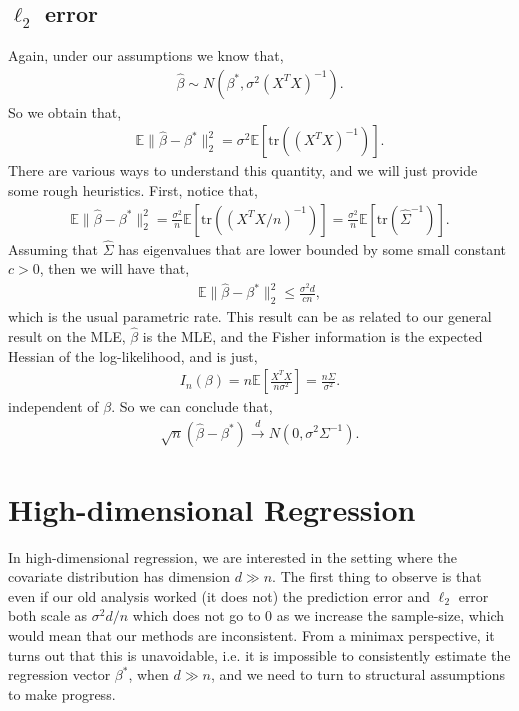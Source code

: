 \documentclass[twoside,12pt]{article}
\newcommand{\cdist}{\overset{d}{\rightarrow}}
\begin{document}
\subsection{$\ell_2$ error}
Again, under our assumptions we know that,
\begin{align*}
\widehat{\beta} \sim N(\beta^*, \sigma^2 (X^T X)^{-1}).
\end{align*}
So we obtain that,
\begin{align*}
\mathbb{E}\|\widehat{\beta} - \beta^*\|_2^2 = \sigma^2 \mathbb{E}\left[\mathrm{tr}((X^T X)^{-1})\right].
\end{align*}
There are various ways to understand this quantity, and we will just provide some rough heuristics. First, notice that,
\begin{align*}
\mathbb{E}\|\widehat{\beta} - \beta^*\|_2^2 = \frac{\sigma^2}{n} \mathbb{E}\left[\mathrm{tr}((X^T X/n)^{-1})\right] = \frac{\sigma^2}{n} \mathbb{E}\left[\mathrm{tr}(\widehat{\Sigma}^{-1})\right].
\end{align*}
Assuming that $\widehat{\Sigma}$ has eigenvalues that are lower bounded by some small constant $c > 0$, then we will have that,
\begin{align*}
\mathbb{E}\|\widehat{\beta} - \beta^*\|_2^2 \leq \frac{\sigma^2 d}{c n},
\end{align*}
which is the usual parametric rate. This result can be as related to our general result on the MLE, $\widehat{\beta}$ is the MLE, and the Fisher information is the expected Hessian of the log-likelihood, and is just,
\begin{align*}
I_n(\beta) =n \mathbb{E}\left[\frac{X^T X}{n \sigma^2}\right] = \frac{n \Sigma}{\sigma^2}.
\end{align*}
independent of $\beta$. So we can conclude that,
\begin{align*}
\sqrt{n} (\widehat{\beta} - \beta^*) \cdist N\left(0, \sigma^2 \Sigma^{-1}\right).
\end{align*}

\section{High-dimensional Regression}
In high-dimensional regression, we are interested in the setting where the covariate distribution has dimension $d \gg n$. The first thing to observe is that even if our old analysis worked (it does not) the prediction error and $\ell_2$ error both scale as $\sigma^2 d/n$ which does not go to $0$ as we increase the sample-size, which would mean that our methods are inconsistent. From a minimax perspective, it turns out that this is unavoidable, i.e. it is impossible to consistently estimate the regression vector $\beta^*$, when $d \gg n$, and we need to turn to structural assumptions to make progress.
\end{document}
